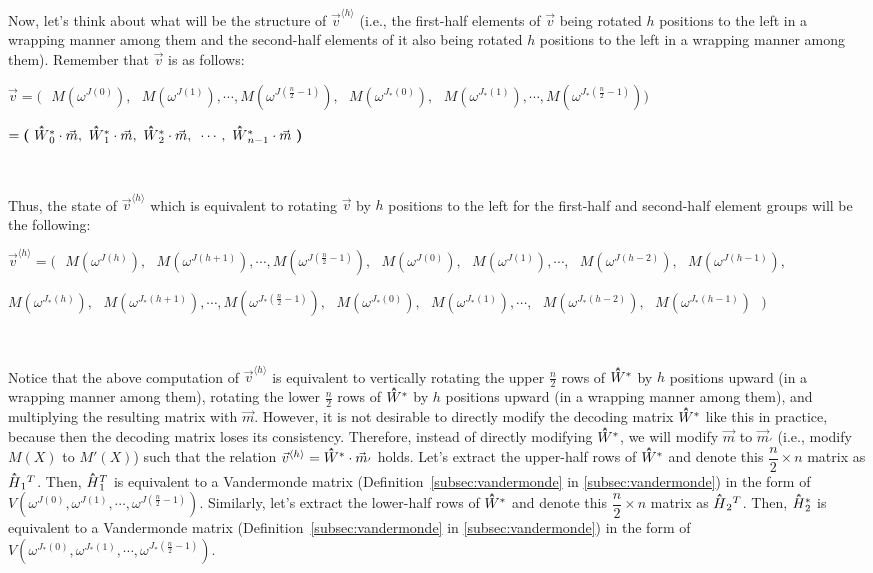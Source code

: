 Now, let's think about what will be the structure of $\vec{v}^{\langle h \rangle}$ (i.e., the first-half elements of $\vec{v}$ being rotated $h$ positions to the left in a wrapping manner among them and the second-half elements of it also being rotated $h$ positions to the left in a wrapping manner among them). Remember that $\vec{v}$ is as follows:

$\vec{v} = \bm{(} \text{ } 
M(\omega^{J(0)}), \text{ } M(\omega^{J(1)}), \cdots,  M(\omega^{J(\frac{n}{2}-1)}), \text{ } 
M(\omega^{J_*(0)}), \text{ } M(\omega^{J_*(1)}),  \cdots,  M(\omega^{J_*(\frac{n}{2}-1)}) \bm{)}$


\text{ } \text{ } $= \bm{(} \text{ } \hathat{W}^*_0\cdot \vec{m}, \text{ } \hathat{W}^*_1\cdot \vec{m}, \text{ } \hathat{W}^*_2\cdot \vec{m}, \text{ } \cdots, \text{ } \hathat{W}^*_{n - 1}\cdot \vec{m} \text{ } \bm{)} $ 

$ $

Thus, the state of $\vec{v}^{\langle h \rangle}$ which is equivalent to rotating $\vec{v}$ by $h$ positions to the left for the first-half and second-half element groups will be the following: 

$\vec{v}^{\langle h \rangle} = \bm{(} \text{ } M(\omega^{J(h)}), \text{ } M(\omega^{J(h+1)}), \cdots, M(\omega^{J(\frac{n}{2}-1)}), \text{ } M(\omega^{J(0)}), \text{ }M(\omega^{J(1)}), \cdots, \text{ } M(\omega^{J(h-2)}), \text{ } M(\omega^{J(h-1)}),$

\text{ }\text{ }\text{ } $ M(\omega^{J_*(h)}), \text{ } M(\omega^{J_*(h+1)}), \cdots, M(\omega^{J_*(\frac{n}{2}-1)}), \text{ } M(\omega^{J_*(0)}), \text{ }M(\omega^{J_*(1)}), \cdots, \text{ } M(\omega^{J_*(h-2)}), \text{ } M(\omega^{J_*(h-1)}) \text{ } \bm{)}$

$ $

Notice that the above computation of $\vec{v}^{\langle h \rangle}$ is equivalent to vertically rotating the upper $\frac{n}{2}$ rows of $\hathat W^*$ by $h$ positions upward (in a wrapping manner among them), rotating the lower $\frac{n}{2}$ rows of $\hathat W^*$ by $h$ positions upward (in a wrapping manner among them), and multiplying the resulting matrix with $\vec{m}$. However, it is not desirable to directly modify the decoding matrix $\hathat W^*$ like this in practice, because then the decoding matrix loses its consistency. Therefore, instead of directly modifying $\hathat W^*$, we will modify $\vec{m}$ to $\vec{m}_{'}$ (i.e., modify $M(X)$ to $M'(X)$) such that the relation $\vec{v}^{\langle h \rangle} = \hathat W^* \cdot \vec{m}_{'}$ holds. Let's extract the upper-half rows of $\hathat W^*$ and denote this $\dfrac{n}{2} \times n$ matrix as $\hathat H_1{^T}$. Then, $\hathat H_1^T$ is equivalent to a Vandermonde matrix (Definition~\ref*{subsec:vandermonde} in \autoref{subsec:vandermonde}) in the form of $V(\omega^{J(0)}, \omega^{J(1)}, \cdots, \omega^{J(\frac{n}{2}-1)})$. Similarly, let's extract the lower-half rows of $\hathat W^*$ and denote this $\dfrac{n}{2} \times n$ matrix as $\hathat H_2{^T}$. Then, $\hathat H_2^*$ is equivalent to a Vandermonde matrix (Definition~\ref*{subsec:vandermonde} in \autoref{subsec:vandermonde}) in the form of $V(\omega^{J_*(0)}, \omega^{J_*(1)}, \cdots, \omega^{J_*(\frac{n}{2}-1)})$. 

